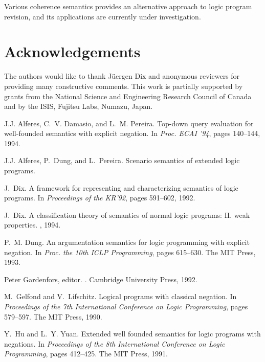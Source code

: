 Various coherence semantics provides an alternative  approach to logic program
revision, and its applications are currently under investigation.

\section*{Acknowledgements}
The authors would like to thank J\"uergen Dix and anonymous reviewers
for providing many constructive comments.  
This work is partially supported by grants from the National
Science and Engineering Research Council of Canada and by
the ISIS, Fujitsu Labs, Numazu, Japan.


%

\begin{thebibliography}{10}

J.J. Alferes, C.~V. Damasio, and L.~M. Pereira.
\newblock Top-down query evaluation for well-founded semantics with explicit
  negation.
\newblock In {\em Proc. ECAI '94}, pages 140--144, 1994.

J.J. Alferes, P.~Dung, and L.~Pereira.
\newblock Scenario semantics of extended logic programs.

J.~Dix.
\newblock A framework for representing and characterizing semantics of logic
  programs.
\newblock In {\em Proceedings of the KR'92}, pages 591--602, 1992.

J.~Dix.
\newblock A classification theory of semantics of normal logic programs: {II}.
  weak properties.
, 1994.

P.~M. Dung.
\newblock An argumentation semantics for logic programming with explicit
  negation.
\newblock In {\em Proc. the 10th ICLP %
  Programming}, pages 615--630. The MIT Press, 1993.

Peter Gardenfors, editor.
.
\newblock Cambridge University Press, 1992.

M.~Gelfond and V.~Lifschitz.
\newblock Logical programs with classical negation.
\newblock In {\em Proceedings of the 7th International Conference on Logic
  Programming}, pages 579--597. The MIT Press, 1990.

Y.~Hu and L.~Y. Yuan.
\newblock Extended well founded semantics for logic programs with negations.
\newblock In {\em Proceedings of the 8th International Conference on Logic
  Programming}, pages 412--425. The MIT Press, 1991.


\end{thebibliography}
